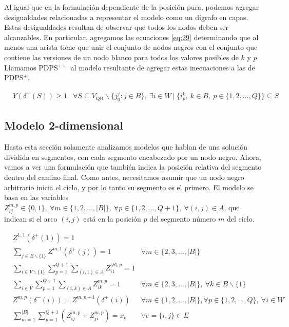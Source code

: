 \documentclass[10pt, a4paper]{article}
\theoremstyle{definition}
\begin{document}
Al igual que en la formulación dependiente de la posición pura, podemos agregar desigualdades relacionadas a representar el modelo como un digrafo en capas. Estas desigualdades resultan de observar que todos los nodos deben ser alcanzables. En particular, agregamos las ecuaciones \ref{eq:29} determinando que al menos una arista tiene que unir el conjunto de nodos negros con el conjunto que contiene las versiones de un nodo blanco para todos los valores posibles de $k$ y $p$. Llamamos PDPS$^{++}$ al modelo resultante de agregar estas inecuaciones a las de PDPS$^{+}$.

\begin{align}
	& Y\left(\delta^{-}(S)\right) \geq 1 & \forall S \subseteq V_{\mathrm{QB}} \backslash\{j_{0}^{j} : j \in B\},\ \exists i \in W\ |\ \{i_{p}^{k},\ k \in B,\ p \in\{1,2, \ldots, Q\}\} \subseteq S \label{eq:29}
\end{align}

\subsection{Modelo 2-dimensional}

Hasta esta sección solamente analizamos modelos que hablan de una solución dividida en segmentos, con cada segmento encabezado por un nodo negro. Ahora, vamos a ver una formulación que también indica la posición relativa del segmento dentro del camino final. Como antes, necesitamos asumir que un nodo negro arbitrario inicia el ciclo, y por lo tanto su segmento es el primero. El modelo se basa en las variables $Z_{i j}^{m, p} \in\{0,1\},\ \forall m \in\{1,2, \ldots,|B|\},\ \forall p \in\{1,2, \ldots, Q+1\},\ \forall(i, j) \in A$, que indican si el arco $(i,j)$ está en la posición $p$ del segmento número $m$ del ciclo.

\begin{align}
	& Z^{1,1}\left(\delta^{+}(1)\right)=1 \label{eq:30} \\
	& \sum_{j \in B \backslash\{1\}} Z^{m, 1}\left(\delta^{+}(j)\right)=1 & \forall m \in\{2,3, \ldots,|B|\} \label{eq:31} \\
	& \sum_{i \in V \backslash\{1\}} \sum_{p=1}^{Q+1} \sum_{(i, 1) \in A} Z_{i 1}^{|B|, p}=1 & \label{eq:32} \\
	& \sum_{i \in V} \sum_{p=1}^{Q+1} \sum_{(i, k) \in A} Z_{i k}^{m, p}=1 & \forall m \in\{2,3, \ldots,|B|\},\ \forall k \in B \backslash\{1\} \label{eq:33} \\
	& Z^{m, p}\left(\delta^{-}(i)\right)=Z^{m, p+1}\left(\delta^{+}(i)\right) & \forall m \in\{1,2, \ldots,|B|\}, \forall p \in\{1,2, \ldots, Q\},\ \forall i \in W \label{eq:34} \\
	& \sum_{m=1}^{|B|} \sum_{p=1}^{Q+1}\left(Z_{i j}^{m, p}+Z_{j i}^{m, p}\right)=x_{e} & \forall e=\{i, j\} \in E \label{eq:35}
\end{align}
\end{document}
